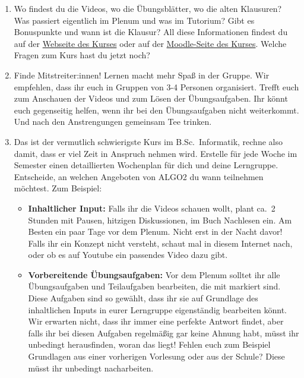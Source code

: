 \documentclass{uebung_cs}
\begin{document}
\begin{exercise}
  \begin{enumerate}
    \item Wo findest du die Videos, wo die Übungsblätter, wo die alten Klausuren?
    Was passiert eigentlich im Plenum und was im Tutorium?
    Gibt es Bonuspunkte und wann ist die Klausur?
    All diese Informationen findest du auf der \href{https://tcs.uni-frankfurt.de/algo2/}{Webseite des Kurses} oder auf der \href{https://moodle.studiumdigitale.uni-frankfurt.de/moodle/course/view.php?id=5636}{Moodle-Seite des Kurses}.
    Welche Fragen zum Kurs hast du jetzt noch? 
    \item Finde Mitstreiter:innen! Lernen macht mehr Spaß in der Gruppe. Wir empfehlen, dass ihr euch in Gruppen von 3-4 Personen organisiert. Trefft euch zum Anschauen der Videos und zum Lösen der Übungsaufgaben. Ihr könnt euch gegenseitig helfen, wenn ihr bei den Übungsaufgaben nicht weiterkommt. Und nach den Anstrengungen gemeinsam Tee trinken.
    \item Das ist der vermutlich schwierigste Kurs im B.Sc.~Informatik, rechne also damit, dass er viel Zeit in Anspruch nehmen wird.
    Erstelle für jede Woche im Semester einen detaillierten Wochenplan für dich und deine Lerngruppe. Entscheide, an welchen Angeboten von ALGO2 du wann teilnehmen möchtest. Zum Beispiel:
    \begin{itemize}
      \item\textbf{Inhaltlicher Input:} Falls ihr die Videos schauen wollt, plant ca.~2 Stunden mit Pausen, hitzigen Diskussionen, im Buch Nachlesen ein. Am Besten ein paar Tage vor dem Plenum. Nicht erst in der Nacht davor! Falls ihr ein Konzept nicht versteht, schaut mal in diesem Internet nach, oder ob es auf Youtube ein passendes Video dazu gibt.
      \item\textbf{Vorbereitende Übungsaufgaben:} Vor dem Plenum solltet ihr alle Übungsaufgaben und Teilaufgaben bearbeiten, die mit \athome markiert sind. Diese Aufgaben sind so gewählt, dass ihr sie auf Grundlage des inhaltlichen Inputs in eurer Lerngruppe eigenständig bearbeiten könnt. Wir erwarten nicht, dass ihr immer eine perfekte Antwort findet, aber falls ihr bei diesen Aufgaben regelmäßig gar keine Ahnung habt, müsst ihr unbedingt herausfinden, woran das liegt! Fehlen euch zum Beispiel Grundlagen aus einer vorherigen Vorlesung oder aus der Schule? Diese müsst ihr unbedingt nacharbeiten.

\end{itemize}
\end{enumerate}
\end{exercise}
\end{document}
